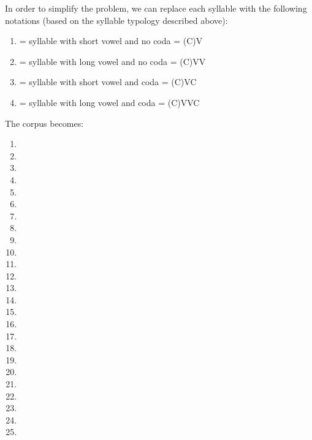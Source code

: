 \begin{refsection}
\begin{mysolution}
In order to simplify the problem, we can replace each syllable with the following notations (based on the syllable typology described above):

\begin{enumerate}[label = \arabic*]
    \item = syllable with short vowel and no coda = (C)V
    \item = syllable with long vowel and no coda = (C)VV
    \item = syllable with short vowel and coda = (C)VC
    \item = syllable with long vowel and coda = (C)VVC
\end{enumerate}

The corpus becomes:\largerpage[2.5]

\begin{multicols}{2}\raggedcolumns
\begin{enumerate}[noitemsep]
    \item {}
    \item {}
    \item {}
    \item {}
    \item {}
    \item {}
    \item {}
    \item {}
    \item {}
    \item {}
    \item {}
    \item {}
    \item {}\columnbreak
    \item {}
    \item {}
    \item {}
    \item {}
    \item {}
    \item {}
    \item {}
    \item {}
    \item {}
    \item {}
    \item {}
    \item {}
\end{enumerate}
\end{multicols}
\pagebreak


\end{mysolution}
\end{refsection}
